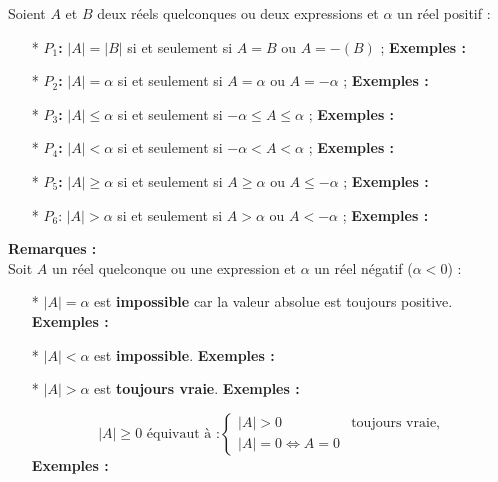 \documentclass[12pt]{article}
\begin{document}
Soient $A$ et $B$ deux réels quelconques ou deux expressions et $\alpha$ un réel positif :
\begin{itemize}
    \item[*] \textbf{ $P_1$:} $|A| = |B|$ si et seulement si $A = B$ ou $A = -(B)$ ;  
    \textbf{Exemples :}
    \item[*] \textbf{ $P_2$:} $|A| = \alpha$ si et seulement si $A = \alpha$ ou $A = -\alpha$ ;  
    \textbf{Exemples :}
    \item[*] \textbf{ $P_3$:} $|A| \leq \alpha$ si et seulement si $-\alpha \leq A \leq \alpha$ ;  
    \textbf{Exemples :}
    \item[*] \textbf{ $P_4$:} $|A| < \alpha$ si et seulement si $-\alpha < A < \alpha$ ;  
    \textbf{Exemples :}
    \item[*] \textbf{ $P_5$:} $|A| \geq \alpha$ si et seulement si $A \geq \alpha$ ou $A \leq -\alpha$ ;  
    \textbf{Exemples :}
    \item[*]  $P_6$: $|A| > \alpha$ si et seulement si $A > \alpha$ ou $A < -\alpha$ ;  
    \textbf{Exemples :}
\end{itemize}
\textbf{Remarques :} \\
Soit $A$ un réel quelconque ou une expression et $\alpha$ un réel négatif ($\alpha < 0$) :
\begin{itemize}
    \item[*] $\lvert A \rvert = \alpha$ est \textbf{impossible} car la valeur absolue est toujours positive. \textbf{Exemples :} 
    \item[*] $\lvert A \rvert < \alpha$ est \textbf{impossible}. \textbf{Exemples :} 
    \item[*] $\lvert A \rvert > \alpha$ est \textbf{toujours vraie}. \textbf{Exemples :} 

    \[\lvert A \rvert \geq 0 \text{ équivaut à :}
    \begin{cases}
        \lvert A \rvert > 0 & \text{toujours vraie}, \\
        \lvert A \rvert = 0 \iff A = 0
    \end{cases}
    \]
    \textbf{Exemples :} 
\end{itemize}
\end{document}
